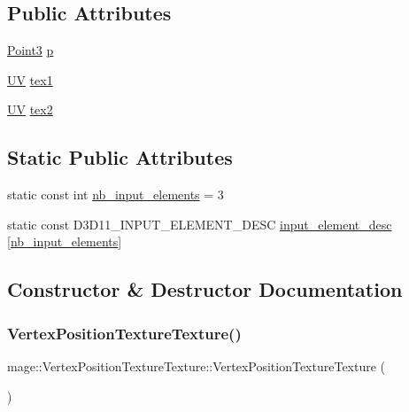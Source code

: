 \subsection*{Public Attributes}
\begin{DoxyCompactItemize}
\item 
\hyperlink{structmage_1_1_point3}{Point3} \hyperlink{structmage_1_1_vertex_position_texture_texture_aed106149eda65a20e60ebc3b93535270}{p}
\item 
\hyperlink{structmage_1_1_u_v}{UV} \hyperlink{structmage_1_1_vertex_position_texture_texture_a96be20a1f6ec9b9b74875099eef80f08}{tex1}
\item 
\hyperlink{structmage_1_1_u_v}{UV} \hyperlink{structmage_1_1_vertex_position_texture_texture_a5a41669f18385d932c1490ff20c80bed}{tex2}
\end{DoxyCompactItemize}
\subsection*{Static Public Attributes}
\begin{DoxyCompactItemize}
\item 
static const int \hyperlink{structmage_1_1_vertex_position_texture_texture_ac15391bbc084b6843ba3b9696b7f502a}{nb\+\_\+input\+\_\+elements} = 3
\item 
static const D3\+D11\+\_\+\+I\+N\+P\+U\+T\+\_\+\+E\+L\+E\+M\+E\+N\+T\+\_\+\+D\+E\+SC \hyperlink{structmage_1_1_vertex_position_texture_texture_a82f271622e34a209d7a3918e7a0190e4}{input\+\_\+element\+\_\+desc} \mbox{[}\hyperlink{structmage_1_1_vertex_position_texture_texture_ac15391bbc084b6843ba3b9696b7f502a}{nb\+\_\+input\+\_\+elements}\mbox{]}
\end{DoxyCompactItemize}


\subsection{Constructor \& Destructor Documentation}
\hypertarget{structmage_1_1_vertex_position_texture_texture_a4dd987362b64d278569f9bd043e2cb8b}{}\label{structmage_1_1_vertex_position_texture_texture_a4dd987362b64d278569f9bd043e2cb8b} 
\subsubsection{\texorpdfstring{Vertex\+Position\+Texture\+Texture()}{VertexPositionTextureTexture()}\hspace{0.1cm}{\footnotesize\ttfamily [1/3]}}
{\footnotesize\ttfamily mage\+::\+Vertex\+Position\+Texture\+Texture\+::\+Vertex\+Position\+Texture\+Texture (\begin{DoxyParamCaption}{ }\end{DoxyParamCaption})\hspace{0.3cm}{\ttfamily [default]}}

